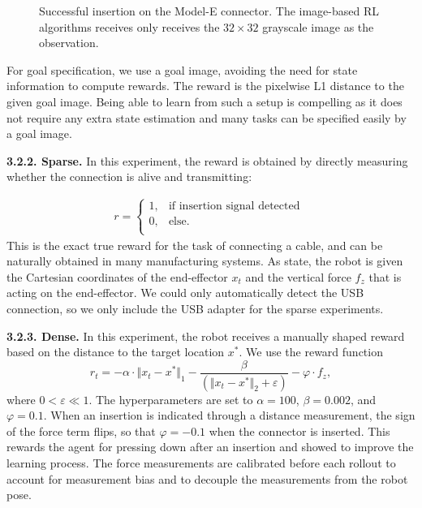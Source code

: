 \begin{figure}
{\begin{subfigure}[b]{0.24\linewidth}
        \centering
    \end{subfigure}   
     }
     \captionsetup{justification=justified, format=plain}
    \caption{Successful insertion on the Model-E connector. The image-based RL algorithms receives only receives the $32\times32$ grayscale image as the observation.
    }
    \label{fig:vision_insertion_sequence}
\end{figure}
For goal specification, we use a goal image, avoiding the need for state information to compute rewards. The reward is the pixelwise L1 distance to the given goal image. Being able to learn from such a setup is compelling as it does not require any extra state estimation and many tasks can be specified easily by a goal image.

\textbf{3.2.2. Sparse. } In this experiment, the reward is obtained by directly measuring whether the connection is alive and transmitting:

\vspace*{0cm}
\begin{align}
 r  = 
  \begin{cases}
    1, & \text{if insertion signal detected } \\
    0, & \text{else. } \\
  \end{cases}
\end{align}
This is the exact true reward for the task of connecting a cable, and can be naturally obtained in many manufacturing systems. As state, the robot is given the Cartesian coordinates of the end-effector $x_t$ and the vertical force $f_z$ that is acting on the end-effector. We could only automatically detect the USB connection, so we only include the USB adapter for the sparse experiments. 

\textbf{3.2.3. Dense. } In this experiment, the robot receives a manually shaped reward based on the distance to the target location $ x^{*}$. We use the reward function
\begin{equation}
r_t =  - \alpha \cdot {\Vert x_t - x^{*} \Vert}_1 -  \frac{\beta}{\left({\Vert x_t - x^{*} \Vert}_2 + \varepsilon\right)} - \varphi \cdot f_z,
\label{eq:shaped_reward_function}
\end{equation}
where $0 < \varepsilon \ll 1$. 
The hyperparameters are set to ${\alpha = 100}$, ${\beta = 0.002}$, and ${\varphi = 0.1}$. When an insertion is indicated through a distance measurement, the sign of the force term flips, so that $\varphi = -0.1$ when the connector is inserted. This rewards the agent for pressing down after an insertion and showed to improve the learning process.
The force measurements are calibrated before each rollout to account for measurement bias and to decouple the measurements from the robot pose. 
